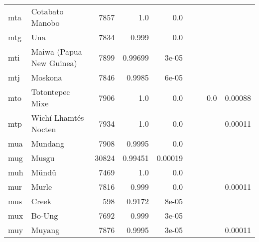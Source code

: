 \documentclass[11pt]{article}
\begin{document}
\begin{table*}[h]
{\begin{tabular}{llrrrrrrr}
mta         & Cotabato Manobo         & 7857         & 1.0         & 0.0         &          &          &          &          \\

mtg         & Una         & 7834         & 0.999         & 0.0         &          &          &          &          \\

mti         & Maiwa (Papua New Guinea)         & 7899         & 0.99699         & 3e-05         &          &          &          &          \\

mtj         & Moskona         & 7846         & 0.9985         & 6e-05         &          &          &          &          \\

mto         & Totontepec Mixe         & 7906         & 1.0         & 0.0         &          &          & 0.0         & 0.00088         \\

mtp         & Wichí Lhamtés Nocten         & 7934         & 1.0         & 0.0         &          &          &          & 0.00011         \\

mua         & Mundang         & 7908         & 0.9995         & 0.0         &          &          &          &          \\

mug         & Musgu         & 30824         & 0.99451         & 0.00019         &          &          &          &          \\

muh         & Mündü         & 7469         & 1.0         & 0.0         &          &          &          &          \\

mur         & Murle         & 7816         & 0.999         & 0.0         &          &          &          & 0.00011         \\

mus         & Creek         & 598         & 0.9172         & 8e-05         &          &          &          &          \\

mux         & Bo-Ung         & 7692         & 0.999         & 3e-05         &          &          &          &          \\

muy         & Muyang         & 7876         & 0.9995         & 3e-05         &          &          &          & 0.00011         \\


\end{tabular}}
\end{table*}
\end{document}
